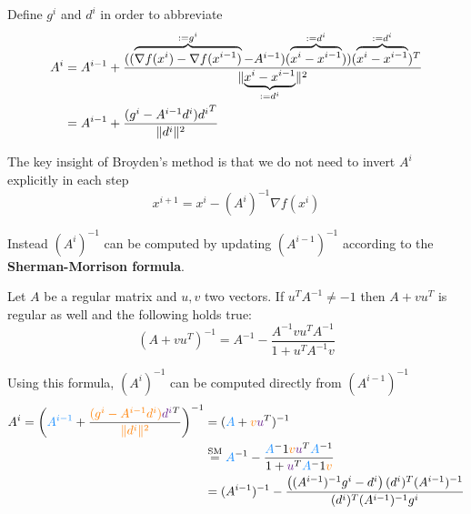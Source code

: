 \documentclass[11pt]{article}
\DeclarePairedDelimiter\norm{\lVert}{\rVert}
\begin{document}
\noindent
Define $g^i$ and $d^i$ in order to abbreviate
\begin{align*}
	A^i &= A^{i-1} + \frac{( (\overbrace{\nabla f(x^i) - \nabla f(x^{i-1})}^{:= g^i} - A^{i-1}) (\overbrace{x^i - x^{i-1}}^{:= d^i}) ) (\overbrace{x^i - x^{i-1}}^{:= d^i})^T}{\norm{\underbrace{x^i - x^{i-1}}_{:= d^i}}^2}\\
	&= A^{i-1} + \frac{(g^i - A^{i-1} d^i) {d^i}^T}{\norm{d^i}^2}
\end{align*}

\noindent
The key insight of Broyden’s method is that we do not need to invert $A^i$ explicitly in each step
\begin{equation*}
	x^{i+1} = x^i - (A^i)^{-1}\nabla f(x^i)
\end{equation*}

\noindent
Instead $(A^i)^{-1}$ can be computed by updating $(A^{i-1})^{-1}$ according to the \textbf{Sherman-Morrison formula}.

\begin{theorem}
	Let $A$ be a regular matrix and $u,v$ two vectors. If $u^T A^{-1} \neq -1$ then $A + vu^T$ is regular as well and the following holds true:
	\begin{equation*}
		\left(A+vu^T\right)^{-1} = A^{-1} - \frac{A^{-1}vu^T A^{-1}}{1 + u^T A^{-1}v}
	\end{equation*}
\end{theorem}

\noindent
Using this formula, $(A^i)^{-1}$ can be computed directly from $(A^{i-1})^{-1}$
\begin{align*}
	A^i = \left({\color{DodgerBlue1} A^{i-1}} + \frac{{\color{DarkOrange1} (g^i - A^{i-1}d^i) } {\color{DarkOrchid4} d^i }^T}{{\color{DarkOrange1} \norm{d^i}^2 }}\right)^{-1} &=  ({\color{DodgerBlue1} A} + {\color{DarkOrange1} v}{\color{DarkOrchid4} u }^T )^{-1}\\
	&\overset{\text{SM}}{=} {\color{DodgerBlue1} A}^{-1} - \frac{{\color{DodgerBlue1} A}^-1 {\color{DarkOrange1} v} {\color{DarkOrchid4} u }^T {\color{DodgerBlue1} A}^{-1}}{1 + {\color{DarkOrchid4} u }^T {\color{DodgerBlue1} A}^-1 {\color{DarkOrange1} v} }\\
	&= (A^{i-1})^{-1} - \frac{\left((A^{i-1})^{-1}g^i-d^i\right)(d^i)^T(A^{i-1})^{-1}}{(d^i)^T(A^{i-1})^{-1}g^i}
\end{align*}
\end{document}
